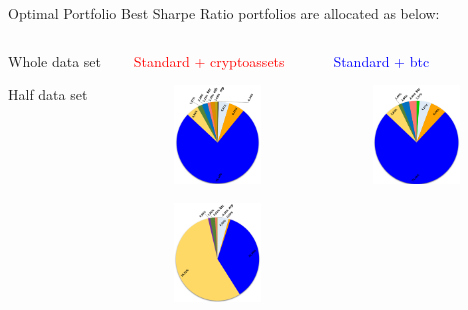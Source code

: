 \documentclass[aspectratio=169]{beamer}
\newcommand\Fontvi{\fontsize{8}{7.2}\selectfont}
\begin{document}
\begin{frame}{Optimal Portfolio}
Best Sharpe Ratio portfolios are allocated as below:
	\begin{columns}
		\begin{column}{0.1\textwidth}
		    \bigskip
		    \bigskip
		    
            \Fontvi{}Whole data set
            \bigskip
            \bigskip
            \bigskip
            \bigskip
            \bigskip
            \bigskip
            \bigskip
            
            
            \Fontvi{}Half data set
		\end{column}
		\begin{column}{0.25\textwidth}  
		    \begin{center}
            \Fontvi{}\textcolor{red}{Standard + cryptoassets}
            \end{center}
            \begin{figure}
                \centering
                \includegraphics[width=2.3cm]{Images/torte/torta_whole_tutte.png}
            \end{figure}
            \begin{figure}
                \centering
                \includegraphics[width=2.3cm]{Images/torte/torta_half_tutte.png}
            \end{figure}
		\end{column}
		\begin{column}{0.25\textwidth}  
		    \begin{center}
            \Fontvi{}\textcolor{blue}{Standard + btc}
            \end{center}
            \begin{figure}
                \centering
                \includegraphics[width=2.3cm]{Images/torte/torta_whole_btc.png}

\end{figure}
\end{column}
\end{columns}
\end{frame}
\end{document}
